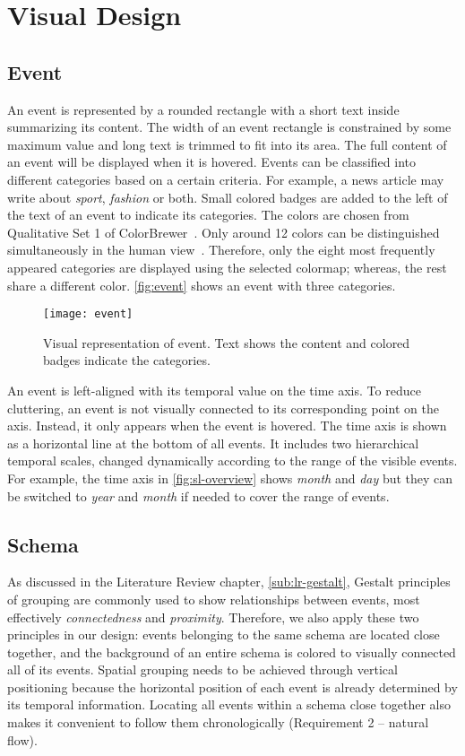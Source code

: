 \section{Visual Design}

\subsection{Event}
An event is represented by a rounded rectangle with a short text inside summarizing its content. The width of an event rectangle is constrained by some maximum value and long text is trimmed to fit into its area. The full content of an event will be displayed when it is hovered. Events can be classified into different categories based on a certain criteria. For example, a news article may write about \emph{sport}, \emph{fashion} or both. Small colored badges are added to the left of the text of an event to indicate its categories. The colors are chosen from Qualitative Set 1 of  ColorBrewer~\cite{Harrower2003}. Only around 12 colors can be distinguished simultaneously in the human view~\cite{Munzner2014}. Therefore, only the eight most frequently appeared categories are displayed using the selected colormap; whereas, the rest share a different color. \autoref{fig:event} shows an event with three categories.

\begin{figure}[!htb]
\centering
\texttt{[image: event]}
\caption{Visual representation of event. Text shows the content and colored badges indicate the categories.}
\label{fig:event}
\end{figure}

An event is left-aligned with its temporal value on the time axis. To reduce cluttering, an event is not visually connected to its corresponding point on the axis. Instead, it only appears when the event is hovered. The time axis is shown as a horizontal line at the bottom of all events. It includes two hierarchical temporal scales, changed dynamically according to the range of the visible events. For example, the time axis in \autoref{fig:sl-overview} shows \emph{month} and \emph{day} but they can be switched to \emph{year} and \emph{month} if needed to cover the range of events.

\subsection{Schema}
\label{sub:schema}
As discussed in the Literature Review chapter, \autoref{sub:lr-gestalt}, Gestalt principles of grouping are commonly used to show relationships between events, most effectively \emph{connectedness} and \emph{proximity}. Therefore, we also apply these two principles in our design: events belonging to the same schema are located close together, and the background of an entire schema is colored to visually connected all of its events. Spatial grouping needs to be achieved through vertical positioning because the horizontal position of each event is already determined by its temporal information. Locating all events within a schema close together also makes it convenient to follow them chronologically (Requirement 2 -- natural flow).

